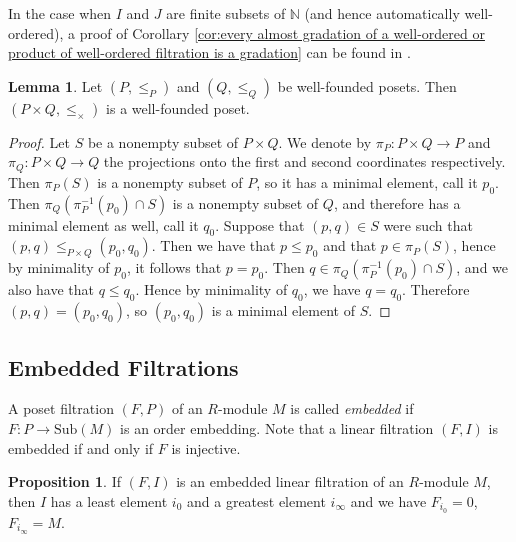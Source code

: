 \documentclass[oneside,11pt]{amsart}
\newcommand{\nn}{\ensuremath{\mathbb{N}}}
\newcommand{\Sub}{\ensuremath{\text{Sub}}}
\theoremstyle{definition}
\newtheorem{proof techniques}{Proof Techniques}
\newtheorem{lemma}{Lemma}
\newtheorem{proposition}{Proposition}
\begin{document}
In the case when $I$ and $J$ are finite subsets of $\nn$ (and hence automatically well-ordered), a proof of Corollary \ref{cor:every almost gradation of a well-ordered or product of well-ordered filtration is a gradation} can be found in \cite{ringel2016}. 


\begin{lemma}\label{lem: product of well-founded posets is well-founded}
Let $(P, \leq_P)$ and $(Q, \leq_Q)$ be well-founded posets. Then $(P \times Q, \leq_{\times})$ is a well-founded poset. 
\end{lemma}

\begin{proof}
Let $S$ be a nonempty subset of $P \times Q$. We denote by $\pi_P : P \times Q \to P$ and $\pi_Q: P \times Q \to Q$ the projections onto the first and second coordinates respectively. Then $\pi_P(S)$ is a nonempty subset of $P$, so it has a minimal element, call it $p_0$. Then $\pi_Q( \pi_P^{-1}(p_0) \cap S )$ is a nonempty subset of $Q$, and therefore has a minimal element as well, call it $q_0$. Suppose that $(p , q) \in S$ were such that $(p , q) \leq_{P \times Q} (p_0 , q_0)$. Then we have that $p \leq p_0$ and that $p \in \pi_P(S)$, hence by minimality of $p_0$, it follows that $p = p_0$. Then $q \in \pi_Q( \pi_P^{-1}(p_0) \cap S )$, and we also have that $q \leq q_0$. Hence by minimality of $q_0$, we have $q = q_0$. Therefore $(p , q) = (p_0 , q_0)$, so $(p_0 , q_0)$ is a minimal element of $S$. 
\end{proof}




\subsection{Embedded Filtrations}

A poset filtration $(F , P)$ of an $R$-module $M$ is called \emph{embedded} if $F : P \to \Sub(M)$ is an order embedding. Note that a linear filtration $(F , I)$ is embedded if and only if $F$ is injective. 

\begin{proposition}\label{prop: embedded linear filtrations have least and greatest elements}
If $(F, I)$ is an embedded linear filtration of an $R$-module $M$, then $I$ has a least element $i_0$ and a greatest element $i_\infty$ and we have $F_{i_0} = 0$, $F_{i_\infty} = M$. 
\end{proposition}
\end{document}
